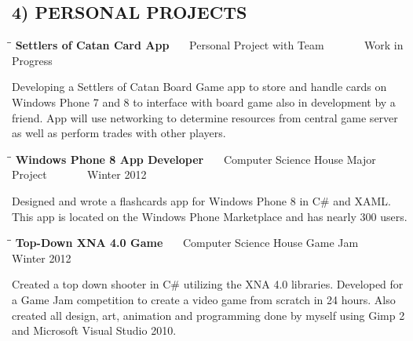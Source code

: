 \documentclass{res}
\begin{document}
\begin{resume}
\section{4) PERSONAL PROJECTS}
  \vspace{-5pt} 
   \begin{tabbing}%
   \hspace{2.3in}\= \hspace{2.6in}\= \kill %
   {\bf Settlers of Catan Card App }  \>~~~Personal Project with Team \> ~~~~~~ Work in Progress\\
   \end{tabbing}\vspace{-30pt}
    Developing a Settlers of Catan Board Game app to store and handle cards on Windows Phone 7 and 8
    to interface with board game also in development by a friend. App will use networking to determine
    resources from central game server as well as perform trades with other players.
   \vspace{-5pt}	
   \begin{tabbing}%
   \hspace{2.3in}\= \hspace{2.6in}\= \kill %
   {\bf Windows Phone 8 App Developer }  \>~~~Computer Science House Major Project \> ~~~~~~ Winter 2012\\
   \end{tabbing}\vspace{-30pt}
    Designed and wrote a flashcards app for Windows Phone 8 in C\# and XAML. This app is located
    on the Windows Phone Marketplace and has nearly 300 users. 
    \vspace{-5pt}
    \begin{tabbing}%
   \hspace{2.3in}\= \hspace{2.6in}\= \kill %
   {\bf Top-Down XNA 4.0 Game }  \>~~~Computer Science House Game Jam \> ~~~~~~ Winter 2012\\
   \end{tabbing}\vspace{-30pt}
    Created a top down shooter in C\# utilizing the XNA 4.0 libraries. 
    Developed for a Game Jam competition to create a video game from scratch in 24 hours. 
    Also created all design, art, animation and programming done by myself using Gimp 2 and Microsoft Visual Studio 2010.

\end{resume}
\end{document}
